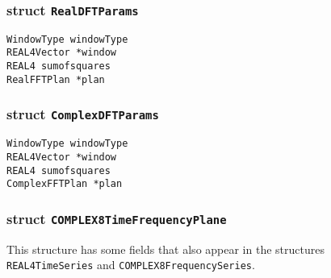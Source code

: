 \subsubsection*{struct \texttt{RealDFTParams}}

\noindent 

\begin{description}
\item[\texttt{WindowType windowType}]
\item[\texttt{REAL4Vector *window}]
\item[\texttt{REAL4 sumofsquares}]
\item[\texttt{RealFFTPlan *plan}]
\end{description}

\subsubsection*{struct \texttt{ComplexDFTParams}}

\noindent 

\begin{description}
\item[\texttt{WindowType  windowType}]
\item[\texttt{REAL4Vector   *window}]
\item[\texttt{REAL4  sumofsquares}]
\item[\texttt{ComplexFFTPlan  *plan}]
\end{description}

\subsubsection*{struct \texttt{COMPLEX8TimeFrequencyPlane}}

\noindent 
This structure has some fields that also appear in the structures
\verb+REAL4TimeSeries+ and \verb+COMPLEX8FrequencySeries+.

